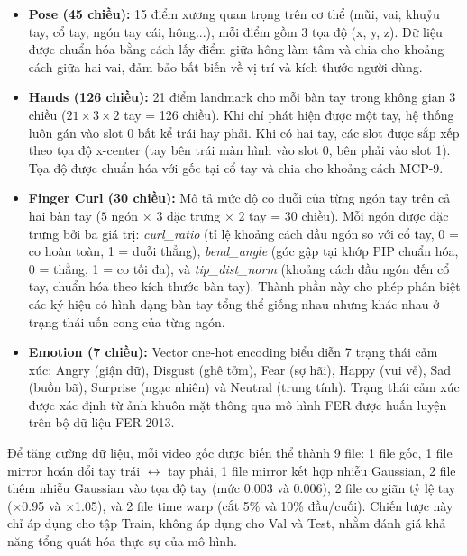 \begin{itemize}
    \item \textbf{Pose (45 chiều):} 15 điểm xương quan trọng trên cơ thể (mũi,
    vai, khuỷu tay, cổ tay, ngón tay cái, hông...), mỗi điểm gồm 3 tọa độ
    (x, y, z). Dữ liệu được chuẩn hóa bằng cách lấy điểm giữa hông làm tâm và
    chia cho khoảng cách giữa hai vai, đảm bảo bất biến về vị trí và kích thước
    người dùng.

    \item \textbf{Hands (126 chiều):} 21 điểm landmark cho mỗi bàn tay trong
    không gian 3 chiều ($21 \times 3 \times 2$ tay = 126 chiều). Khi chỉ phát
    hiện được một tay, hệ thống luôn gán vào slot 0 bất kể trái hay phải. Khi
    có hai tay, các slot được sắp xếp theo tọa độ x-center (tay bên trái màn
    hình vào slot 0, bên phải vào slot 1). Tọa độ được chuẩn hóa với gốc tại
    cổ tay và chia cho khoảng cách MCP-9.

    \item \textbf{Finger Curl (30 chiều):} Mô tả mức độ co duỗi của từng ngón
    tay trên cả hai bàn tay ($5$ ngón $\times$ 3 đặc trưng $\times$ 2 tay = 30
    chiều). Mỗi ngón được đặc trưng bởi ba giá trị: \textit{curl\_ratio} (tỉ lệ
    khoảng cách đầu ngón so với cổ tay, 0 = co hoàn toàn, 1 = duỗi thẳng),
    \textit{bend\_angle} (góc gập tại khớp PIP chuẩn hóa, 0 = thẳng, 1 = co tối
    đa), và \textit{tip\_dist\_norm} (khoảng cách đầu ngón đến cổ tay, chuẩn hóa
    theo kích thước bàn tay). Thành phần này cho phép phân biệt các ký hiệu có
    hình dạng bàn tay tổng thể giống nhau nhưng khác nhau ở trạng thái uốn cong
    của từng ngón.

    \item \textbf{Emotion (7 chiều):} Vector one-hot encoding biểu diễn 7 trạng
    thái cảm xúc: Angry (giận dữ), Disgust (ghê tởm), Fear (sợ hãi), Happy (vui
    vẻ), Sad (buồn bã), Surprise (ngạc nhiên) và Neutral (trung tính). Trạng
    thái cảm xúc được xác định từ ảnh khuôn mặt thông qua mô hình FER được huấn
    luyện trên bộ dữ liệu FER-2013.
\end{itemize}

Để tăng cường dữ liệu, mỗi video gốc được biến thể thành 9 file: 1 file
gốc, 1 file mirror hoán đổi tay trái $\leftrightarrow$ tay phải, 1 file mirror
kết hợp nhiễu Gaussian, 2 file thêm nhiễu Gaussian vào tọa độ tay (mức 0.003 và
0.006), 2 file co giãn tỷ lệ tay ($\times$0.95 và $\times$1.05), và 2 file time
warp (cắt 5\% và 10\% đầu/cuối). Chiến lược này chỉ áp dụng cho tập
Train, không áp dụng cho Val và Test, nhằm đánh giá khả năng tổng quát hóa thực
sự của mô hình.

